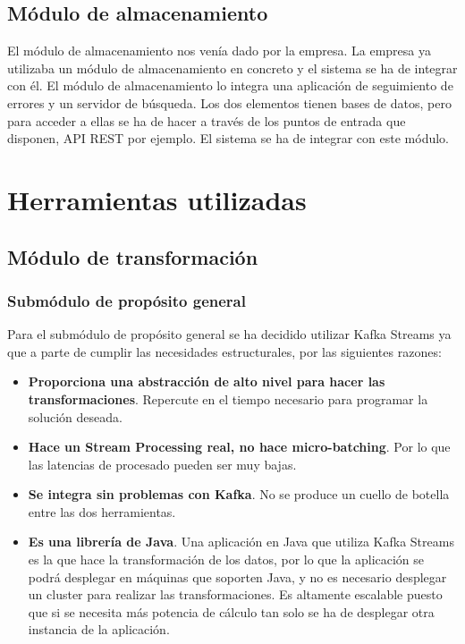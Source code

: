 \subsection{Módulo de almacenamiento}
El módulo de almacenamiento nos venía dado por la empresa. La empresa ya utilizaba un módulo de almacenamiento en concreto y el sistema se ha de integrar con él. El módulo de almacenamiento lo integra una aplicación de seguimiento de errores y un servidor de búsqueda. Los dos elementos tienen bases de datos, pero para acceder a ellas se ha de hacer a través de los puntos de entrada que disponen, API REST por ejemplo. El sistema se ha de integrar con este módulo.
\section{Herramientas utilizadas}

\subsection{Módulo de transformación}
\subsubsection{Submódulo de propósito general}
Para el submódulo de propósito general se ha decidido utilizar Kafka Streams\cite{Tfg:kafkastreams} ya que a parte de cumplir las necesidades estructurales, por las siguientes razones:

\begin{itemize}
	\item \textbf{Proporciona una abstracción de alto nivel para hacer las transformaciones}. Repercute en el tiempo necesario para programar la solución deseada.
	
	\item \textbf{Hace un Stream Processing real, no hace micro-batching}. Por lo que las latencias de procesado pueden ser muy bajas.
	
	\item \textbf{Se integra sin problemas con Kafka}. No se produce un cuello de botella entre las dos herramientas.
	
	\item \textbf{Es una librería de Java}. Una aplicación en Java que utiliza Kafka Streams es la que hace la transformación de los datos, por lo que la aplicación se podrá desplegar en máquinas que soporten Java, y no es necesario desplegar un cluster para realizar las transformaciones. Es altamente escalable puesto que si se necesita más potencia de cálculo tan solo se ha de desplegar otra instancia de la aplicación.
\end{itemize}



